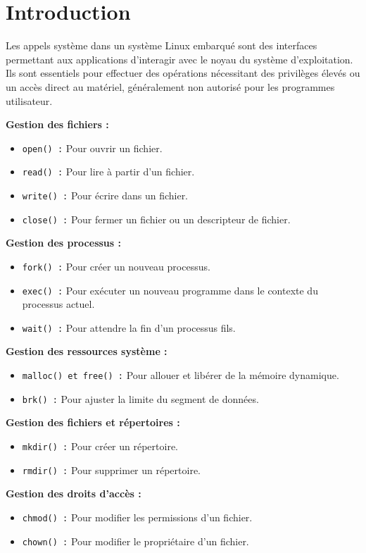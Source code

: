 \section*{Introduction}
Les appels système dans un système Linux embarqué sont des interfaces permettant aux applications d'interagir avec le noyau du système d'exploitation. Ils sont essentiels pour effectuer des opérations nécessitant des privilèges élevés ou un accès direct au matériel, généralement non autorisé pour les programmes utilisateur.

\textbf{Gestion des fichiers :}
\begin{itemize}
    \item \texttt{open() :} Pour ouvrir un fichier.
    \item \texttt{read() :} Pour lire à partir d'un fichier.
    \item \texttt{write() :} Pour écrire dans un fichier.
    \item \texttt{close() :} Pour fermer un fichier ou un descripteur de fichier.
\end{itemize}

\textbf{Gestion des processus :}
\begin{itemize}
    \item \texttt{fork() :} Pour créer un nouveau processus.
    \item \texttt{exec() :} Pour exécuter un nouveau programme dans le contexte du processus actuel.
    \item \texttt{wait() :} Pour attendre la fin d'un processus fils.
\end{itemize}

\textbf{Gestion des ressources système :}
\begin{itemize}
    \item \texttt{malloc() et free() :} Pour allouer et libérer de la mémoire dynamique.
    \item \texttt{brk() :} Pour ajuster la limite du segment de données.
\end{itemize}

\textbf{Gestion des fichiers et répertoires :}
\begin{itemize}
    \item \texttt{mkdir() :} Pour créer un répertoire.
    \item \texttt{rmdir() :} Pour supprimer un répertoire.
\end{itemize}

\textbf{Gestion des droits d'accès :}
\begin{itemize}
    \item \texttt{chmod() :} Pour modifier les permissions d'un fichier.
    \item \texttt{chown() :} Pour modifier le propriétaire d'un fichier.
\end{itemize}
